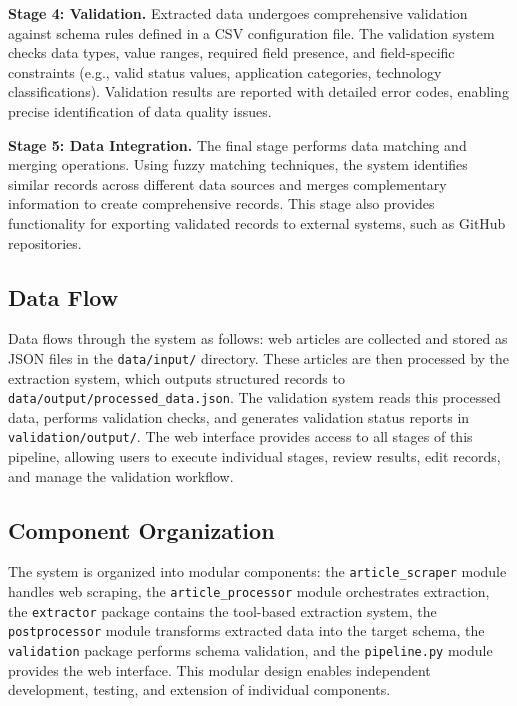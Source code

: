 \documentclass[11pt]{article}
\begin{document}
\textbf{Stage 4: Validation.} Extracted data undergoes comprehensive validation against schema rules defined in a CSV configuration file. The validation system checks data types, value ranges, required field presence, and field-specific constraints (e.g., valid status values, application categories, technology classifications). Validation results are reported with detailed error codes, enabling precise identification of data quality issues.

\textbf{Stage 5: Data Integration.} The final stage performs data matching and merging operations. Using fuzzy matching techniques, the system identifies similar records across different data sources and merges complementary information to create comprehensive records. This stage also provides functionality for exporting validated records to external systems, such as GitHub repositories.

\subsection{Data Flow}

Data flows through the system as follows: web articles are collected and stored as JSON files in the \texttt{data/input/} directory. These articles are then processed by the extraction system, which outputs structured records to \texttt{data/output/processed\_data.json}. The validation system reads this processed data, performs validation checks, and generates validation status reports in \texttt{validation/output/}. The web interface provides access to all stages of this pipeline, allowing users to execute individual stages, review results, edit records, and manage the validation workflow.

\subsection{Component Organization}

The system is organized into modular components: the \texttt{article\_scraper} module handles web scraping, the \texttt{article\_processor} module orchestrates extraction, the \texttt{extractor} package contains the tool-based extraction system, the \texttt{postprocessor} module transforms extracted data into the target schema, the \texttt{validation} package performs schema validation, and the \texttt{pipeline.py} module provides the web interface. This modular design enables independent development, testing, and extension of individual components.
\end{document}
